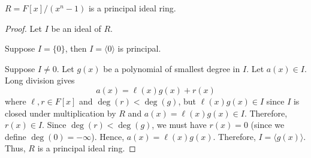 \begin{thmbox}
    \begin{theorem}
        $ R=F[x]/(x^n-1) $ is a principal ideal ring.
    \end{theorem}
\end{thmbox}

\begin{proof}
    Let $ I $ be an ideal of $ R $. 
    
    Suppose $ I=\{0\} $, then $ I=\langle 0\rangle $ is principal.

    Suppose $ I\neq 0 $. Let $ g(x) $ be a polynomial of smallest
    degree in $ I $. Let $ a(x)\in I $. Long division
    gives
    \[ a(x)=\ell(x)g(x)+r(x) \]
    where $ \ell,r\in F[x] $ and $ \deg(r)<\deg(g) $, but $ \ell(x)g(x)\in I $
    since $ I $ is closed under multiplication by $ R $ and
    $ a(x)=\ell(x)g(x)\in I $. Therefore, $ r(x)\in I $.
    Since $ \deg(r) <\deg(g) $, we must have $ r(x)=0 $ (since we define
    $ \deg(0)=-\infty $). Hence, $ a(x)=\ell(x)g(x) $. Therefore,
    $ I=\langle g(x) \rangle $. Thus, $ R $ is a principal ideal ring.
\end{proof}
